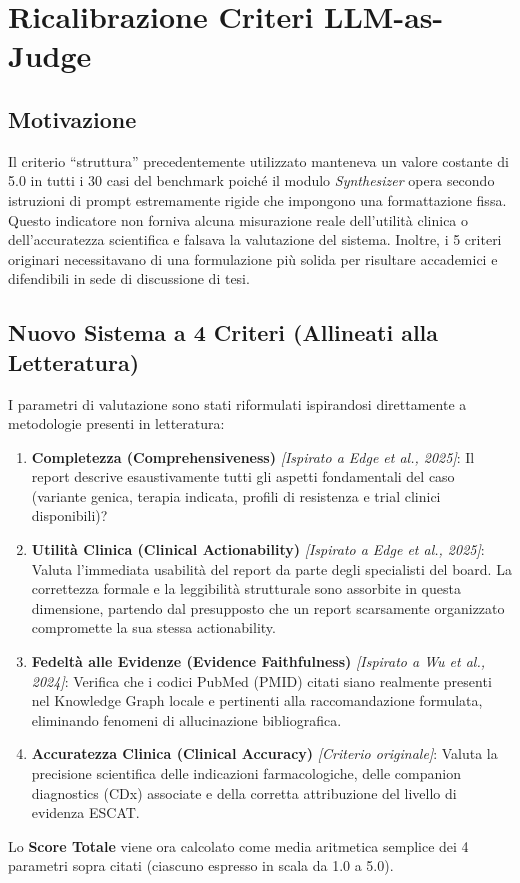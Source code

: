 \documentclass[12pt, a4paper]{article}
\begin{document}
\section{Ricalibrazione Criteri LLM-as-Judge}

\subsection{Motivazione}
Il criterio ``struttura'' precedentemente utilizzato manteneva un valore costante di 5.0 in tutti i 30 casi del benchmark poiché il modulo \textit{Synthesizer} opera secondo istruzioni di prompt estremamente rigide che impongono una formattazione fissa. Questo indicatore non forniva alcuna misurazione reale dell'utilità clinica o dell'accuratezza scientifica e falsava la valutazione del sistema. Inoltre, i 5 criteri originari necessitavano di una formulazione più solida per risultare accademici e difendibili in sede di discussione di tesi.

\subsection{Nuovo Sistema a 4 Criteri (Allineati alla Letteratura)}
I parametri di valutazione sono stati riformulati ispirandosi direttamente a metodologie presenti in letteratura:
\begin{enumerate}[leftmargin=1.6em, itemsep=4pt]
  \item \textbf{Completezza (Comprehensiveness)} \textit{[Ispirato a Edge et al., 2025]}: Il report descrive esaustivamente tutti gli aspetti fondamentali del caso (variante genica, terapia indicata, profili di resistenza e trial clinici disponibili)?
  \item \textbf{Utilità Clinica (Clinical Actionability)} \textit{[Ispirato a Edge et al., 2025]}: Valuta l'immediata usabilità del report da parte degli specialisti del board. La correttezza formale e la leggibilità strutturale sono assorbite in questa dimensione, partendo dal presupposto che un report scarsamente organizzato compromette la sua stessa actionability.
  \item \textbf{Fedeltà alle Evidenze (Evidence Faithfulness)} \textit{[Ispirato a Wu et al., 2024]}: Verifica che i codici PubMed (PMID) citati siano realmente presenti nel Knowledge Graph locale e pertinenti alla raccomandazione formulata, eliminando fenomeni di allucinazione bibliografica.
  \item \textbf{Accuratezza Clinica (Clinical Accuracy)} \textit{[Criterio originale]}: Valuta la precisione scientifica delle indicazioni farmacologiche, delle companion diagnostics (CDx) associate e della corretta attribuzione del livello di evidenza ESCAT.
\end{enumerate}
Lo \textbf{Score Totale} viene ora calcolato come media aritmetica semplice dei 4 parametri sopra citati (ciascuno espresso in scala da 1.0 a 5.0).
\end{document}
